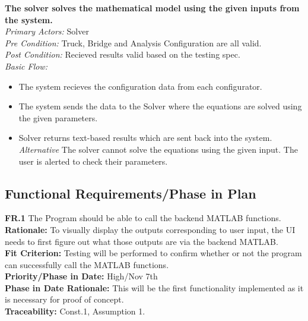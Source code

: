 \documentclass[12pt]{article}
\begin{document}
\noindent
\textbf{The solver solves the mathematical model using the given inputs from the system.} \\
\emph{  Primary Actors:} Solver\\
\emph{  Pre Condition:} Truck, Bridge and Analysis Configuration are all valid.\\
\emph{  Post Condition:} Recieved results valid based on the testing spec.\\ 
\emph{  Basic Flow:} 
\begin{itemize}
\item The system recieves the configuration data from each configurator. 
\item The system sends the data to the Solver where the equations are solved using the given parameters. 
\item Solver returns text-based results which are sent back into the system. 
\subitem \emph{Alternative} The solver cannot solve the equations using the given input. The user is alerted to check their parameters. 
\end{itemize}




\subsection{Functional Requirements/Phase in Plan}
  \textbf{FR.1} The Program should be able to call the backend MATLAB functions. \\
  \textbf{Rationale:} To visually display the outputs corresponding to user input, the UI needs to first figure out what those outputs are via the backend MATLAB.\\
  \textbf{Fit Criterion:} Testing will be performed to confirm whether or not the program can successfully call the MATLAB functions.\\
  \textbf{Priority/Phase in Date:} High/Nov 7th\\
  \textbf{Phase in Date Rationale:} This will be the first functionality implemented as it is necessary for proof of concept.\\
  \textbf{Traceability:} Const.1, Assumption 1.\\\\
  
\end{document}
